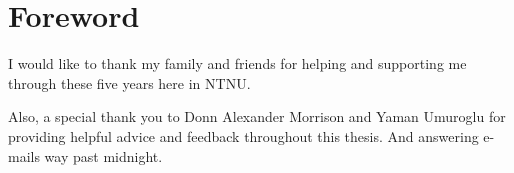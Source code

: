 \chapter{Foreword}

I would like to thank my family and friends for helping and supporting me through these five years here in NTNU.

Also, a special thank you to Donn Alexander Morrison and  Yaman Umuroglu for providing helpful advice and feedback throughout this thesis. And answering e-mails way past midnight. 
